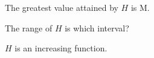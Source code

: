 \documentclass{ximera}
\begin{document}
\begin{exercise}
The greatest value attained by $H$ is M.

\begin{multipleChoice}
\end{multipleChoice}

\end{exercise}







\begin{exercise}
The range of $H$ is which interval?

\begin{multipleChoice}
\choice[correct]{$[M, \infty)$}
\choice{$(-\infty, -M]$}
\choice{$(-\infty, M]$}
\end{multipleChoice}

\end{exercise}



\begin{exercise}
$H$ is an increasing function.

\begin{multipleChoice}
\end{multipleChoice}

\end{exercise}
\end{document}
